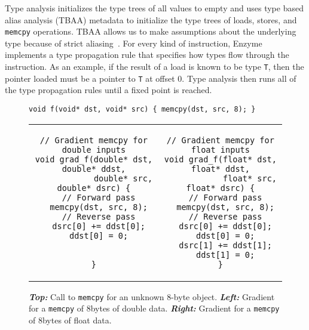 Type analysis initializes the type trees of all values to empty and uses type based alias analysis (TBAA) metadata to initialize the type trees of loads, stores, and \texttt{memcpy} operations.
TBAA allows us to make assumptions about the underlying type because of strict aliasing~\cite{10.1145/277650.277670, langref_2020}. For every kind of instruction, Enzyme implements a type propagation rule that specifies how types flow through the instruction. As an example, if the result of a load is known to be type \texttt{T}, then the pointer loaded must be a pointer to \texttt{T} at offset 0. Type analysis then runs all of the type propagation rules until a fixed point is reached.
\begin{figure*}
    \centering
\begin{verbatim}
void f(void* dst, void* src) { memcpy(dst, src, 8); }
\end{verbatim}
\begin{tabular}{c|c}
\begin{minipage}[T]{0.49\linewidth}
\begin{verbatim}
// Gradient memcpy for double inputs
void grad_f(double* dst, double* ddst,
            double* src, double* dsrc) {
  // Forward pass
  memcpy(dst, src, 8);
  // Reverse pass
  dsrc[0] += ddst[0];
  ddst[0] = 0;
  
  
}
\end{verbatim}
\end{minipage}&
\begin{minipage}[T]{0.49\linewidth}
\begin{verbatim}
// Gradient memcpy for float inputs
void grad_f(float* dst, float* ddst,
            float* src, float* dsrc) {
  // Forward pass
  memcpy(dst, src, 8);
  // Reverse pass
  dsrc[0] += ddst[0];
  ddst[0] = 0;
  dsrc[1] += ddst[1];
  ddst[1] = 0;
}
\end{verbatim}
\end{minipage}
\end{tabular}
\caption{{\textbf{\textit{Top:}}} Call to \texttt{memcpy} for an unknown 8-byte object. {\textbf{\textit{Left:}}} Gradient for a \texttt{memcpy} of 8bytes of double data. {\textbf{\textit{Right:}}} Gradient for a \texttt{memcpy} of 8bytes of float data. }
\label{fig:memcpy}
\end{figure*}

